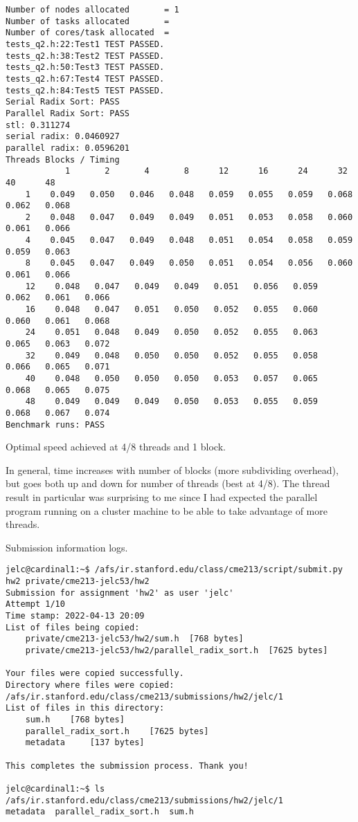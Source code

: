 \documentclass[12pt,letterpaper,twoside]{article}
\begin{document}
\begin{itemize}
\begin{verbatim}
Number of nodes allocated		= 1
Number of tasks allocated		= 
Number of cores/task allocated 	= 
tests_q2.h:22:Test1	TEST PASSED.
tests_q2.h:38:Test2	TEST PASSED.
tests_q2.h:50:Test3	TEST PASSED.
tests_q2.h:67:Test4	TEST PASSED.
tests_q2.h:84:Test5	TEST PASSED.
Serial Radix Sort: PASS
Parallel Radix Sort: PASS
stl: 0.311274
serial radix: 0.0460927
parallel radix: 0.0596201
Threads Blocks / Timing
            1       2       4       8      12      16      24      32      40      48
    1    0.049   0.050   0.046   0.048   0.059   0.055   0.059   0.068   0.062   0.068
    2    0.048   0.047   0.049   0.049   0.051   0.053   0.058   0.060   0.061   0.066
    4    0.045   0.047   0.049   0.048   0.051   0.054   0.058   0.059   0.059   0.063
    8    0.045   0.047   0.049   0.050   0.051   0.054   0.056   0.060   0.061   0.066
    12    0.048   0.047   0.049   0.049   0.051   0.056   0.059   0.062   0.061   0.066
    16    0.048   0.047   0.051   0.050   0.052   0.055   0.060   0.060   0.061   0.068
    24    0.051   0.048   0.049   0.050   0.052   0.055   0.063   0.065   0.063   0.072
    32    0.049   0.048   0.050   0.050   0.052   0.055   0.058   0.066   0.065   0.071
    40    0.048   0.050   0.050   0.050   0.053   0.057   0.065   0.068   0.065   0.075
    48    0.049   0.049   0.049   0.050   0.053   0.055   0.059   0.068   0.067   0.074
Benchmark runs: PASS
\end{verbatim} 
    
    Optimal speed achieved at 4/8 threads and 1 block.  
    
    In general, time increases with number of blocks (more subdividing overhead), but goes both 
    up and down for number of threads (best at 4/8). The thread result in particular was surprising
    to me since I had expected the parallel program running on a cluster machine to be able to take 
    advantage of more threads.

\end{itemize}


Submission information logs.
\begin{verbatim}
jelc@cardinal1:~$ /afs/ir.stanford.edu/class/cme213/script/submit.py hw2 private/cme213-jelc53/hw2
Submission for assignment 'hw2' as user 'jelc'
Attempt 1/10
Time stamp: 2022-04-13 20:09
List of files being copied:
    private/cme213-jelc53/hw2/sum.h	 [768 bytes]
    private/cme213-jelc53/hw2/parallel_radix_sort.h	 [7625 bytes]

Your files were copied successfully.
Directory where files were copied: /afs/ir.stanford.edu/class/cme213/submissions/hw2/jelc/1
List of files in this directory:
    sum.h	 [768 bytes]
    parallel_radix_sort.h	 [7625 bytes]
    metadata	 [137 bytes]

This completes the submission process. Thank you!

jelc@cardinal1:~$ ls /afs/ir.stanford.edu/class/cme213/submissions/hw2/jelc/1
metadata  parallel_radix_sort.h  sum.h
\end{verbatim}
\end{document}

